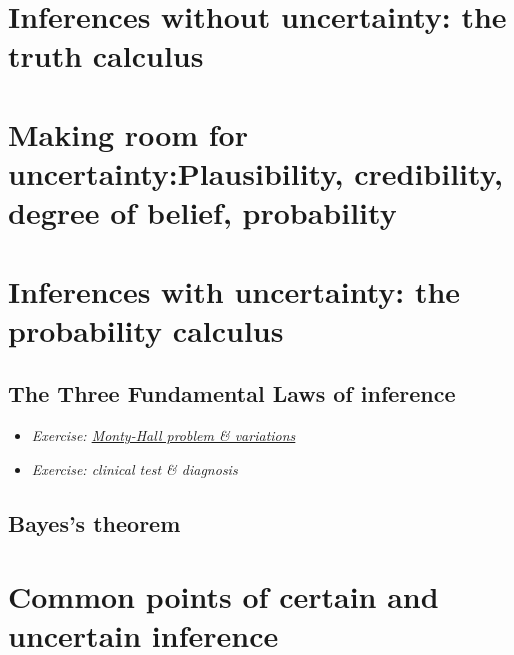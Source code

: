 \documentclass[
  letterpaper,
  DIV=11,
  numbers=noendperiod,
  oneside]{scrreprt}
\begin{document}
\hypertarget{inferences-without-uncertainty-the-truth-calculus}{%
\section{Inferences without uncertainty: the truth
calculus}\label{inferences-without-uncertainty-the-truth-calculus}}

\hypertarget{making-room-for-uncertainty-plausibility-credibility-degree-of-belief-probability}{%
\section{\texorpdfstring{Making room for uncertainty:Plausibility,
credibility, degree of belief,
probability}{Making room for uncertainty: Plausibility, credibility, degree of belief, probability}}\label{making-room-for-uncertainty-plausibility-credibility-degree-of-belief-probability}}

\hypertarget{inferences-with-uncertainty-the-probability-calculus}{%
\section{Inferences with uncertainty: the probability
calculus}\label{inferences-with-uncertainty-the-probability-calculus}}

\hypertarget{the-three-fundamental-laws-of-inference}{%
\subsection{The Three Fundamental Laws of
inference}\label{the-three-fundamental-laws-of-inference}}

\begin{itemize}
\item
  \emph{Exercise: \href{The_Monty_Hall_problem-exercise.pdf}{Monty-Hall
  problem \& variations}}
\item
  \emph{Exercise: clinical test \& diagnosis}
\end{itemize}

\hypertarget{bayess-theorem}{%
\subsection{Bayes's theorem}\label{bayess-theorem}}

\hypertarget{common-points-of-certain-and-uncertain-inference}{%
\section{Common points of certain and uncertain
inference}\label{common-points-of-certain-and-uncertain-inference}}
\end{document}
